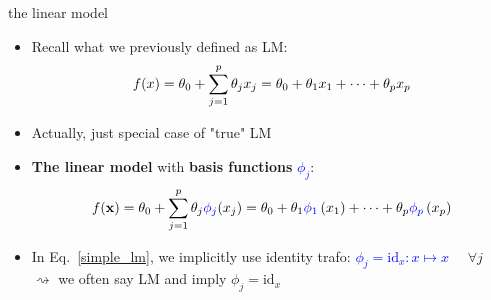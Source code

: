 \documentclass[11pt,compress,t,notes=noshow, xcolor=table]{beamer}
\begin{document}
\begin{vbframe}{the linear model}

\begin{itemize}
    \item Recall what we previously defined as LM:
    \begin{equation} \label{simple_lm}
      f(x) = \theta_0 + \sum\limits_{j=1}^p \theta_j x_j =
      \theta_0 + \theta_1 x_1 + \dots + \theta_p x_p
    \end{equation}
    \item Actually, just special case of "true" LM
    \item \textbf{The linear model} with \textbf{basis functions}
    \textcolor{blue}{$\phi_j$}:
    \begin{equation*} \label{true_lm}
      f(\mathbf{x}) = \theta_0 + \sum\limits_{j=1}^p \theta_j \textcolor{blue}{\phi_j} (x_j)
      = \theta_0 + \theta_1  \textcolor{blue}{\phi_1} \left( x_1 \right)
      + \dots + \theta_p \textcolor{blue}{\phi_p} \left(x_p \right)
    \end{equation*}
    \item In Eq.~\ref{simple_lm}, we implicitly use identity trafo:
    \textcolor{blue}{$\phi_j = \text{id}_x: x \mapsto x$}~~ $\forall j$ \\
    $\rightsquigarrow$ we often say LM and imply
    $\phi_j = \text{id}_x$
\end{itemize}

\end{vbframe}

\end{document}
